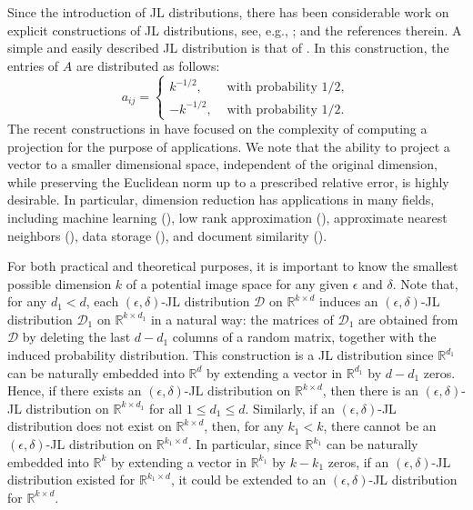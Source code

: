 \documentclass[twoside,11pt]{article}
\newcommand{\D}{\mathcal{D}}
\newcommand{\R}{{\mathbb R}}
\begin{document}
Since the introduction of JL distributions, there has been considerable work on explicit constructions of JL distributions, see, e.g.,
 \cite{JohnsonLindenstrauss, FranklMaehara, IndykMotwani, Achlioptas, AilonChazelle_ANN, Matousek, DasguptaKumarSarlos, KaneNelson_Sparser}; and the references therein. 
 A simple and easily described  JL distribution is that of  \cite{Achlioptas}. In this construction, the entries  of $A$ are distributed as follows:
 \[a_{ij} =\begin{cases} k^{-1/2}, & \text{ with probability } 1/2, \\ 
			            -k^{-1/2}, & \text{ with probability } 1/2.	
              \end{cases}
\]
The recent constructions in \cite{AilonChazelle_ANN, Matousek, DasguptaKumarSarlos, KaneNelson_Sparser} have focused on the complexity of computing a 
 projection for the purpose of applications. We note that the  ability to project a vector to a smaller dimensional space, independent of the original dimension, while preserving the Euclidean norm up to a prescribed relative error, is highly desirable.  In particular, dimension reduction has applications in many fields, including machine learning 
(\cite{MachineLearning_Vempala, MachineLearning_Weinberger}), low rank approximation  (\cite{LowRank_ClarksonWoodruff, LowRank_Nguyen, LowRank_Ubaru}), approximate nearest neighbors (\cite{AilonChazelle_ANN, IndykMotwani}), data storage (\cite{RIP_Candes, Streaming}), and document similarity (\cite{DocSim_Bingham, DocSim_Lin}). 


For both practical and theoretical purposes,  it is important to know the smallest possible dimension $k$ of a potential image space 
for any given  $\epsilon$ and $\delta$.  
Note that, for any $d_1 < d$, each $(\epsilon, \delta)$-JL distribution $\D$ on $\R^{k\times d}$ induces an  $(\epsilon, \delta)$-JL distribution $\D_1$ on $\R^{k\times d_1}$  in a natural way: 
the matrices  of $\D_1$ are  obtained from $\D$ by deleting the last $d-d_1$ columns of a random matrix, together with the induced probability distribution.   This construction is a JL distribution since $\R^{d_1}$ can be naturally embedded into $\R^d$ by extending a vector in $\R^{d_1}$ by $d-d_1$ zeros.
Hence, if there exists an $(\epsilon, \delta)$-JL distribution on $\R^{k\times d}$, then there is an $(\epsilon, \delta)$-JL distribution on $\R^{k\times d_1}$ for all $1 \leq d_1 \leq d$.  Similarly, if an $(\epsilon,\delta)$-JL distribution does not exist on $\mathbb{R}^{k\times d}$, then, for any $k_1<k$, there cannot be an $(\epsilon,\delta)$-JL distribution on $\mathbb{R}^{k_1\times d}$.  In particular, since $\mathbb{R}^{k_1}$ can be naturally embedded into $\mathbb{R}^k$ by extending a vector in $\mathbb{R}^{k_1}$ by $k-k_1$ zeros, if an $(\epsilon,\delta)$-JL distribution existed for $\mathbb{R}^{k_1\times d}$, it could be extended to an $(\epsilon,\delta)$-JL distribution for $\mathbb{R}^{k\times d}$.
\end{document}
